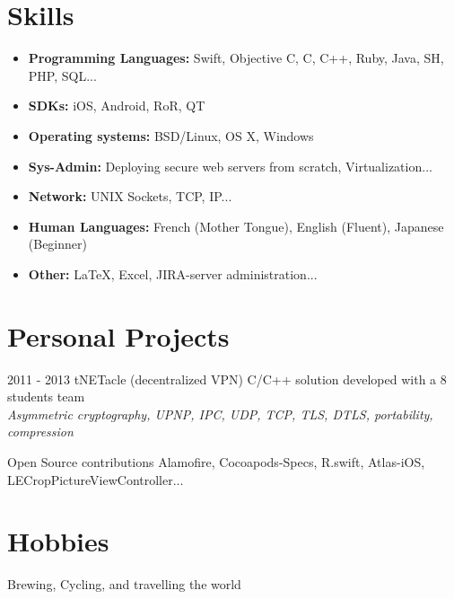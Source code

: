 \documentclass[]{template/friggeri-cv} %
\begin{document}

\section{Skills}

\begin{itemize}
\item \textbf{Programming Languages:} Swift, Objective C, C, C++, Ruby, Java, SH, PHP, SQL...
\item \textbf{SDKs:} iOS, Android, RoR, QT
\item \textbf{Operating systems:} BSD/Linux, OS X, Windows
\item \textbf{Sys-Admin:} Deploying secure web servers from scratch, Virtualization...
\item \textbf{Network:} UNIX Sockets, TCP, IP...
\item \textbf{Human Languages:} French (Mother Tongue), English (Fluent), Japanese (Beginner)
\item \textbf{Other:} \LaTeX, Excel, JIRA-server administration...
\end{itemize}


\section{Personal Projects}
\begin{entrylist}
  \entry
      {2011 - 2013}
      {tNETacle (decentralized VPN)}
      {}
      {C/C++ solution developed with a 8 students team \\
      \emph{Asymmetric cryptography, UPNP, IPC, UDP, TCP, TLS, DTLS, portability, compression}}

\entry
{}
{Open Source contributions}
{}
{Alamofire, Cocoapods-Specs, R.swift, Atlas-iOS, LECropPictureViewController...}


\end{entrylist}


\section{Hobbies}

{Brewing, Cycling, and travelling the world}
\end{document}
